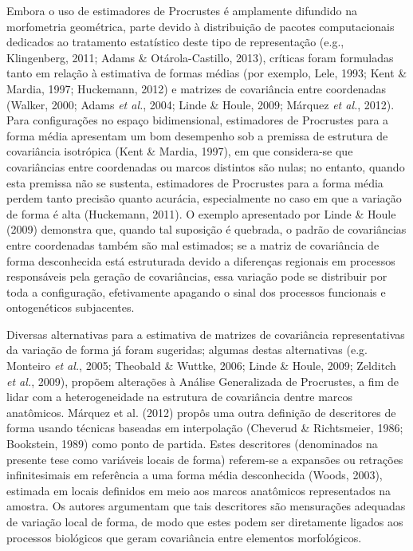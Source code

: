 \documentclass[12pt,twoside]{report}
\begin{document}
Embora o uso de estimadores de Procrustes é amplamente difundido na
morfometria geométrica, parte devido à distribuição de pacotes
computacionais dedicados ao tratamento estatístico deste tipo de
representação (e.g., Klingenberg, 2011; Adams \& Otárola-Castillo,
2013), críticas foram formuladas tanto em relação à estimativa de formas
médias (por exemplo, Lele, 1993; Kent \& Mardia, 1997; Huckemann, 2012)
e matrizes de covariância entre coordenadas (Walker, 2000; Adams
\emph{et al.}, 2004; Linde \& Houle, 2009; Márquez \emph{et al.}, 2012).
Para configurações no espaço bidimensional, estimadores de Procrustes
para a forma média apresentam um bom desempenho sob a premissa de
estrutura de covariância isotrópica (Kent \& Mardia, 1997), em que
considera-se que covariâncias entre coordenadas ou marcos distintos são
nulas; no entanto, quando esta premissa não se sustenta, estimadores de
Procrustes para a forma média perdem tanto precisão quanto acurácia,
especialmente no caso em que a variação de forma é alta (Huckemann,
2011). O exemplo apresentado por Linde \& Houle (2009) demonstra que,
quando tal suposição é quebrada, o padrão de covariâncias entre
coordenadas também são mal estimados; se a matriz de covariância de
forma desconhecida está estruturada devido a diferenças regionais em
processos responsáveis pela geração de covariâncias, essa variação pode
se distribuir por toda a configuração, efetivamente apagando o sinal dos
processos funcionais e ontogenéticos subjacentes.

Diversas alternativas para a estimativa de matrizes de covariância
representativas da variação de forma já foram sugeridas; algumas destas
alternativas (e.g. Monteiro \emph{et al.}, 2005; Theobald \& Wuttke,
2006; Linde \& Houle, 2009; Zelditch \emph{et al.}, 2009), propõem
alterações à Análise Generalizada de Procrustes, a fim de lidar com a
heterogeneidade na estrutura de covariância dentre marcos anatômicos.
Márquez et al. (2012) propôs uma outra definição de descritores de forma
usando técnicas baseadas em interpolação (Cheverud \& Richtsmeier, 1986;
Bookstein, 1989) como ponto de partida. Estes descritores (denominados
na presente tese como variáveis locais de forma) referem-se a expansões
ou retrações infinitesimais em referência a uma forma média desconhecida
(Woods, 2003), estimada em locais definidos em meio aos marcos
anatômicos representados na amostra. Os autores argumentam que tais
descritores são mensurações adequadas de variação local de forma, de
modo que estes podem ser diretamente ligados aos processos biológicos
que geram covariância entre elementos morfológicos.
\end{document}
